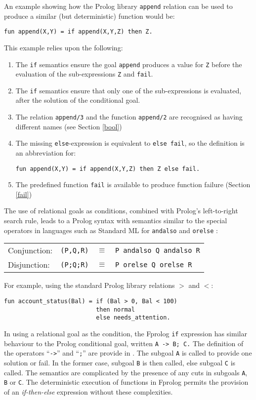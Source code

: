 \documentclass[a4paper,11pt,twoside]{article}
\begin{document}
An example showing how the Prolog library \texttt{append} relation can
be used to produce a similar (but deterministic) function would be:
\begin{verbatim}
fun append(X,Y) = if append(X,Y,Z) then Z.
\end{verbatim}
This example relies upon the following:
\begin{enumerate}
\item{The \texttt{if} semantics ensure the goal \texttt{append} produces a
  value for \texttt{Z} before the evaluation of the sub-expressions
  \texttt{Z} and \texttt{fail}.}
\item{The \texttt{if} semantics ensure that
  only one of the sub-expressions is
  evaluated, after the
  solution of the conditional goal.}
\item{The relation \texttt{append/3} and the function \texttt{append/2} are recognised
  as having different names (see Section \ref{bool})}
\item{The missing \texttt{else}-expression is equivalent to \texttt{else fail}, so the
  definition is an abbreviation for:\\
  \centerline{\texttt{fun append(X,Y) = if append(X,Y,Z) then Z else fail.}}
  }
\item{The predefined function \texttt{fail} is available to produce
  function failure (Section \ref{fail})}
\end{enumerate}

The use of relational goals as conditions, combined with Prolog's left-to-right
search rule,
leads to a Prolog syntax with semantics similar to the special operators in languages
such as Standard ML for \texttt{andalso} and \texttt{orelse} \cite{MTH90}:

\begin{tabular}{l l l l}
Conjunction: & \texttt{(P,Q,R)} & $\equiv$ & \texttt{P andalso Q andalso R}\\
Disjunction: & \texttt{(P;Q;R)} & $\equiv$ & \texttt{P orelse Q orelse R}
\end{tabular}

For example, using the standard Prolog library relations $>$ and $<$:
\begin{verbatim}
fun account_status(Bal) = if (Bal > 0, Bal < 100)
                          then normal
                          else needs_attention.
\end{verbatim}
In using a relational goal as the condition, the Fprolog \texttt{if} expression 
has similar behaviour to the Prolog conditional goal, written \texttt{A -> B; C.}
The definition of the operators ``\texttt{->}'' and ``\texttt{;}'' are provide in
\cite{DEDC96}.  The subgoal \texttt{A} is called to provide one solution or fail.
In the former case, subgoal \texttt{B} is then called, else subgoal \texttt{C} is
called.  The semantics are complicated by the presence of any cuts in subgoals
\texttt{A}, \texttt{B} or \texttt{C}.  The deterministic execution of functions in
Fprolog permits the provision of an \textit{if-then-else} expression without these
complexities.
\end{document}
